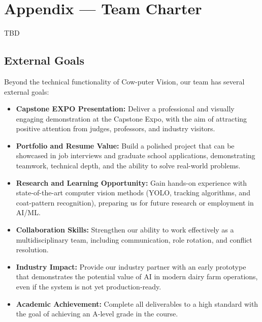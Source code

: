 \documentclass{article}
\newcommand{\progname}{Cow-puter Vision} %
\begin{document}
\newpage{}

\section*{Appendix --- Team Charter}
{\color{red} TBD}

\subsection*{External Goals}

Beyond the technical functionality of \progname{}, our team has several external goals:

\begin{itemize}
  \item \textbf{Capstone EXPO Presentation:} Deliver a professional and visually engaging demonstration
        at the Capstone Expo, with the aim of attracting positive attention from judges, professors, 
        and industry visitors.
  \item \textbf{Portfolio and Resume Value:} Build a polished project that can be showcased in 
        job interviews and graduate school applications, demonstrating teamwork, technical depth, 
        and the ability to solve real-world problems.
  \item \textbf{Research and Learning Opportunity:} Gain hands-on experience with state-of-the-art
        computer vision methods (YOLO, tracking algorithms, and coat-pattern recognition), 
        preparing us for future research or employment in AI/ML.
  \item \textbf{Collaboration Skills:} Strengthen our ability to work effectively as a multidisciplinary 
        team, including communication, role rotation, and conflict resolution.
  \item \textbf{Industry Impact:} Provide our industry partner with an early prototype that 
        demonstrates the potential value of AI in modern dairy farm operations, 
        even if the system is not yet production-ready.
  \item \textbf{Academic Achievement:} Complete all deliverables to a high standard with the goal of 
        achieving an A-level grade in the course.
\end{itemize}
\end{document}
